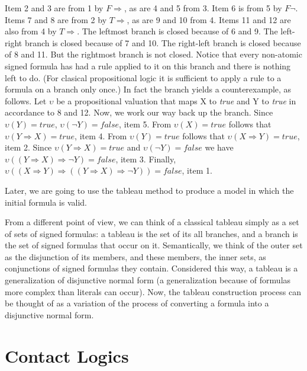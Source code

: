 \documentclass{article}
\begin{document}
	\par
	Item 2 and 3 are from 1 by $F \Rightarrow$, as are 4 and 5 from 3. Item 6 is from 5 by $F \neg$. Items 7 and 8 are from 2 by $T \Rightarrow$, as are 9 and 10 from 4. Items 11 and 12 are also from 4 by $T \Rightarrow$. The leftmost branch is closed because of 6 and 9. The left-right branch is closed because of 7 and 10. The right-left branch is closed because of 8 and 11. But the rightmost branch is not closed. Notice that every non-atomic signed formula has had a rule applied to it on this branch and there is nothing left to do. (For clasical propositional logic it is sufficient to apply a rule to a formula on a branch only once.) In fact the branch yields a counterexample, as follows. Let $\upsilon$ be a propositional valuation that maps X to \textit{true} and Y to \textit{true} in accordance to 8 and 12. Now, we work our way back up the branch. Since $\upsilon(Y) = true$, $\upsilon(\neg Y) = false$, item 5. From $\upsilon(X) = true$ follows that $\upsilon(Y \Rightarrow X) = true$, item 4. From $\upsilon(Y) = true$ follows that $\upsilon(X \Rightarrow Y) = true$, item 2. Since $\upsilon(Y \Rightarrow X) = true$ and $\upsilon(\neg Y) = false$ we have $\upsilon((Y \Rightarrow X) \Rightarrow \neg Y) = false$, item 3. Finally, $\upsilon((X \Rightarrow Y) \Rightarrow ((Y \Rightarrow X) \Rightarrow \neg Y)) = false$, item 1.
	\par
	Later, we are going to use the tableau method to produce a model in which the initial formula is valid.
	\par
	From a different point of view, we can think of a classical tableau simply as a set of sets of signed formulas: a tableau is the set of its all branches, and a branch is the set of signed formulas that occur on it. Semantically, we think of the outer set as the disjunction of its members, and these members, the inner sets, as conjunctions of signed formulas they contain. Considered this way, a tableau is a generalization of disjunctive normal form (a generalization because of formulas more complex than literals can occur). Now, the tableau construction process can be thought of as a variation of the process of converting a formula into a disjunctive normal form. 	

	\newpage
	\section{Contact Logics}
\end{document}
